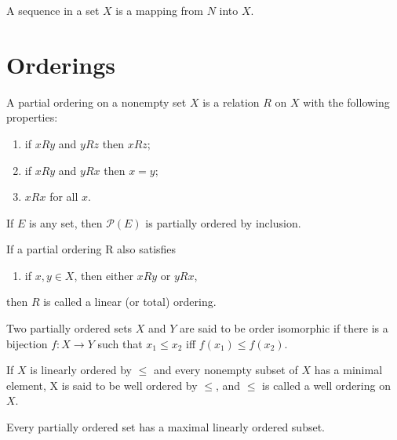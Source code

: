 A sequence in a set $X$ is a mapping from $N$ into $X$.

\section{Orderings}

\begin{definition}
    A partial ordering on a nonempty set $X$ is a relation $R$ on $X$ with the following properties:
    \begin{enumerate}
        \item if $x R y$ and $y R z$ then $x R z$;
        \item if $x R y$ and $y R x$ then $x = y$;
        \item $x R x$ for all $x$.
    \end{enumerate}
\end{definition}

\begin{example}
    If $E$ is any set, then $\mathcal{P}(E)$ is partially ordered by inclusion.
\end{example}

\begin{definition}
    If a partial ordering R also satisfies
    \begin{enumerate}
        \item if $x, y \in X$, then either $x R y$ or $y R x$,
    \end{enumerate}
    then $R$ is called a linear (or total) ordering.
\end{definition}

\begin{definition}
    Two partially ordered sets $X$ and $Y$ are said to be order isomorphic if there is a bijection $f: X \to Y$ such that $x_1 \le x_2$ iff $f(x_1) \le f(x_2)$.
\end{definition}

\begin{definition}
    If $X$ is linearly ordered by $\le$ and every nonempty subset of $X$ has a minimal element, X is said to be well ordered by $\le$, and $\le$ is called a well ordering on $X$.   
\end{definition}

\begin{theorem}
    Every partially ordered set has a maximal linearly ordered subset.
\end{theorem}

